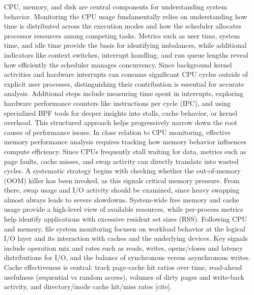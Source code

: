 CPU, memory, and disk are central components for understanding system behavior. Monitoring the CPU usage fundamentally relies on understanding how time is distributed across the execution modes and how the scheduler allocates processor resources among competing tasks. Metrics such as user time, system time, and idle time provide the basis for identifying imbalances, while additional indicators like context switches, interrupt handling, and run queue lengths reveal how efficiently the scheduler manages concurrency. Since background kernel activities and hardware interrupts can consume significant CPU cycles outside of explicit user processes, distinguishing their contribution is essential for accurate analysis. Additional steps include measuring time spent in interrupts, exploring hardware performance counters like instructions per cycle (IPC), and using specialized BPF tools for deeper insights into stalls, cache behavior, or kernel overhead. This structured approach helps progressively narrow down the root causes of performance issues.
In close relation to CPU monitoring, effective memory performance analysis requires tracking how memory behavior influences compute efficiency. Since CPUs frequently stall waiting for data, metrics such as page faults, cache misses, and swap activity can directly translate into wasted cycles. A systematic strategy begins with checking whether the out-of-memory (OOM) killer has been invoked, as this signals critical memory pressure. From there, swap usage and I/O activity should be examined, since heavy swapping almost always leads to severe slowdowns. System-wide free memory and cache usage provide a high-level view of available resources, while per-process metrics help identify applications with excessive resident set sizes (RSS).
Following CPU and memory, file system monitoring focusen on workload behavior at the logical I/O layer and its interaction with caches and the underlying devices. Key signals include operation mix and rates such as reads, writes, opens/closes and latency distributions for I/O, and the balance of synchronous versus asynchronous writes. Cache effectiveness is central: track page-cache hit ratios over time, read-ahead usefulness (sequential vs random access), volumes of dirty pages and write-back activity, and directory/inode cache hit/miss rates [cite].

